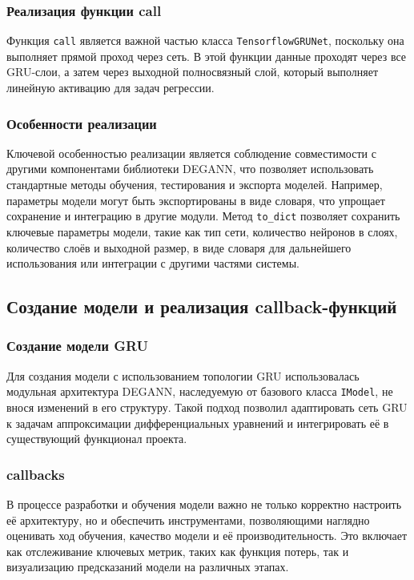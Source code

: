 \subsubsection{Реализация функции call}
Функция \texttt{call} является важной частью класса \texttt{TensorflowGRUNet}, поскольку она выполняет прямой проход через сеть. В этой функции данные проходят через все GRU-слои, а затем через выходной полносвязный слой, который выполняет линейную активацию для задач регрессии.

\subsubsection{Особенности реализации}
Ключевой особенностью реализации является соблюдение совместимости с другими компонентами библиотеки DEGANN, что позволяет использовать стандартные методы обучения, тестирования и экспорта моделей. Например, параметры модели могут быть экспортированы в виде словаря, что упрощает сохранение и интеграцию в другие модули. Метод \texttt{to_dict} позволяет сохранить ключевые параметры модели, такие как тип сети, количество нейронов в слоях, количество слоёв и выходной размер, в виде словаря для дальнейшего использования или интеграции с другими частями системы.




\subsection{Создание модели и реализация callback-функций}
\label{subsec:model_callbacks}

\subsubsection{Создание модели GRU}
Для создания модели с использованием топологии GRU использовалась модульная архитектура DEGANN, наследуемую от базового класса \texttt{IModel}, не внося изменений в его структуру. Такой подход позволил адаптировать сеть GRU к задачам аппроксимации дифференциальных уравнений и интегрировать её в существующий функционал проекта.

\subsubsection{callbacks}
В процессе разработки и обучения модели важно не только корректно настроить её архитектуру, но и обеспечить инструментами, позволяющими наглядно оценивать ход обучения, качество модели и её производительность. Это включает как отслеживание ключевых метрик, таких как функция потерь, так и визуализацию предсказаний модели на различных этапах.

